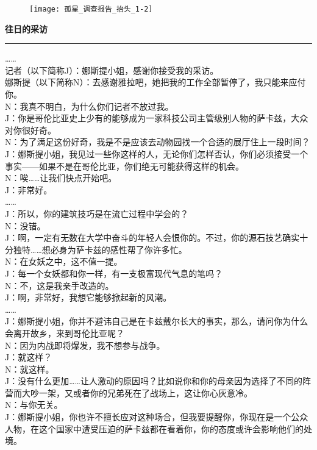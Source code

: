 \documentclass[openany]{book}
\begin{document}
\begin{figure}[h]
    \centering
    \texttt{[image: 孤星\_调查报告\_抬头\_1-2]}
\end{figure}
{\Large\textbf{往日的采访}}\par\noindent\rule{\textwidth}{0.4pt}
……\\
记者（以下简称J）：娜斯提小姐，感谢你接受我的采访。\\
娜斯提（以下简称N）：去感谢雅拉吧，她把我的工作全部暂停了，我只能来应付你。\\
N：我真不明白，为什么你们记者不放过我。\\
J：你是哥伦比亚史上少有的能够成为一家科技公司主管级别人物的萨卡兹，大众对你很好奇。\\
N：为了满足这份好奇，我是不是应该去动物园找一个合适的展厅住上一段时间？\\
J：娜斯提小姐，我见过一些你这样的人，无论你们怎样否认，你们必须接受一个事实——如果不是在哥伦比亚，你们绝无可能获得这样的机会。\\
N：唉……让我们快点开始吧。\\
J：非常好。\\
……\\
J：所以，你的建筑技巧是在流亡过程中学会的？\\
N：没错。\\
J：啊，一定有无数在大学中奋斗的年轻人会恨你的。不过，你的源石技艺确实十分独特……想必身为萨卡兹的感性帮了你许多忙。\\
N：在女妖之中，这不值一提。\\
J：每一个女妖都和你一样，有一支极富现代气息的笔吗？\\
N：不，这是我亲手改造的。\\
J：啊，非常好，我想它能够掀起新的风潮。\\
……\\
J：娜斯提小姐，你并不避讳自己是在卡兹戴尔长大的事实，那么，请问你为什么会离开故乡，来到哥伦比亚呢？\\
N：因为内战即将爆发，我不想参与战争。\\
J：就这样？\\
N：就这样。\\
J：没有什么更加……让人激动的原因吗？比如说你和你的母亲因为选择了不同的阵营而大吵一架，又或者你的兄弟死在了战场上，这让你心灰意冷。\\
N：与你无关。\\
J：娜斯提小姐，你也许不擅长应对这种场合，但我要提醒你，你现在是一个公众人物，在这个国家中遭受压迫的萨卡兹都在看着你，你的态度或许会影响他们的处境。\\
\end{document}
